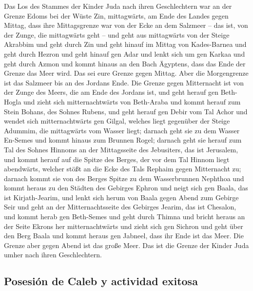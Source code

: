  Das Los des Stammes der Kinder Juda nach ihren
Geschlechtern war an der Grenze Edoms bei der Wüste Zin, mittagwärts, am
Ende des Landes gegen Mittag,  dass ihre Mittagsgrenze war
von der Ecke an dem Salzmeer -- das ist, von der Zunge, die mittagwärts
geht --  und geht aus mittagwärts von der Steige Akrabbim
und geht durch Zin und geht hinauf im Mittag von Kades-Barnea und geht
durch Hezron und geht hinauf gen Adar und lenkt sich um gen Karkaa
 und geht durch Azmon und kommt hinaus an den Bach
Ägyptens, dass das Ende der Grenze das Meer wird. Das sei eure Grenze
gegen Mittag.  Aber die Morgengrenze ist das Salzmeer bis
an des Jordans Ende. Die Grenze gegen Mitternacht ist von der Zunge des
Meers, die am Ende des Jordans ist,  und geht herauf gen
Beth-Hogla und zieht sich mitternachtwärts von Beth-Araba und kommt
herauf zum Stein Bohans, des Sohnes Rubens,  und geht
herauf gen Debir vom Tal Achor und wendet sich mitternachtwärts gen
Gilgal, welches liegt gegenüber der Steige Adummim, die mittagwärts vom
Wasser liegt; darnach geht sie zu dem Wasser En-Semes und kommt hinaus
zum Brunnen Rogel;  darnach geht sie herauf zum Tal des
Sohnes Hinnoms an der Mittagsseite des Jebusiters, das ist Jerusalem,
und kommt herauf auf die Spitze des Berges, der vor dem Tal Hinnom liegt
abendwärts, welcher stößt an die Ecke des Tals Rephaim gegen Mitternacht
zu;  darnach kommt sie von des Berges Spitze zu dem
Wasserbrunnen Nephthoa und kommt heraus zu den Städten des Gebirges
Ephron und neigt sich gen Baala, das ist Kirjath-Jearim, 
und lenkt sich herum von Baala gegen Abend zum Gebirge Seir und geht an
der Mitternachtsseite des Gebirges Jearim, das ist Chesalon, und kommt
herab gen Beth-Semes und geht durch Thimna  und bricht
heraus an der Seite Ekrons her mitternachtwärts und zieht sich gen
Sichron und geht über den Berg Baala und kommt heraus gen Jabneel, dass
ihr Ende ist das Meer.  Die Grenze aber gegen Abend ist
das große Meer. Das ist die Grenze der Kinder Juda umher nach ihren
Geschlechtern.

\hypertarget{posesiuxf3n-de-caleb-y-actividad-exitosa}{%
\subsection{Posesión de Caleb y actividad
exitosa}\label{posesiuxf3n-de-caleb-y-actividad-exitosa}}

